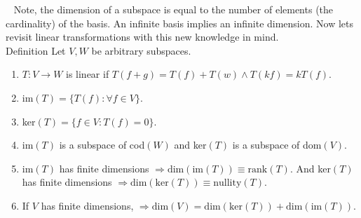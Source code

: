 \documentclass[11 pt]{article}
\begin{document}
$\,\,\,$ Note, the dimension of a subspace is equal to the number of elements (the cardinality) of the basis. An infinite basis implies an infinite dimension. Now lets revisit linear transformations with this new knowledge in mind.\\

Definition Let $V,W$ be arbitrary subspaces.
\begin{enumerate}
\item $T:V\rightarrow W$ is linear if $T(f+g)=T(f)+T(w)\land T(kf)=kT(f)$.
\item im$(T)=\lbrace T(f):\forall f\in V\rbrace$.
\item ker$(T)=\lbrace f\in V:T(f)=0\rbrace$.
\item im$(T)$ is a subspace of cod$(W)$ and ker$(T)$ is a subspace of dom$(V)$.
\item im$(T)$ has finite dimensions $\Rightarrow \text{dim}(\text{im}(T))\equiv\text{rank}(T)$. And ker$(T)$ has finite dimensions $\Rightarrow \text{dim}(\text{ker}(T))\equiv\text{nullity}(T)$.
\item If $V$ has finite dimensions, $\Rightarrow \text{dim}(V)=\text{dim}(\text{ker}(T))+\text{dim}(\text{im}(T))$.
\end{enumerate}
\end{document}
